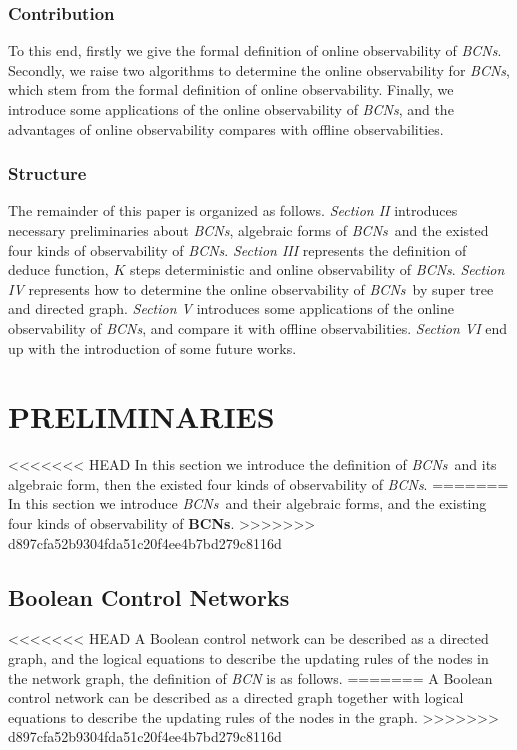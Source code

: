 \documentclass[conference]{IEEEtran} %
\def \BCNs {{\em BCNs}}
\newcommand{\rev}[1]{{\color{red}{#1}}}
\newcommand{\tl}[1]{\textcolor{blue} {TL: #1 :TL} }
\begin{document}
\subsubsection*{Contribution}
To this end, firstly we give the formal definition of online observability of {\em BCNs}. Secondly, we raise two algorithms to determine the online observability for {\em BCNs}, which stem from the formal definition of online observability. Finally, we introduce some applications of the online observability of {\em BCNs}, and the advantages of online observability compares with offline observabilities. %
\subsubsection*{Structure}
The remainder of this paper is organized as follows. {\em Section II} introduces necessary preliminaries about {\em BCNs}, algebraic forms of \BCNs\ and the existed four kinds of observability of {\em BCNs}. {\em Section III} represents the definition of deduce function, $K$ steps deterministic and online observability of {\em BCNs}. {\em Section IV} represents how to determine the online observability of \BCNs\ by super tree and directed graph. {\em Section V} introduces some applications of the online observability of {\em BCNs}, and compare it with offline observabilities. {\em Section VI} end up  with the introduction of some future works.


\section{PRELIMINARIES}
<<<<<<< HEAD
In this section we introduce the definition of \BCNs\ and its algebraic form, then the existed four kinds of observability of {\em BCNs}.
=======
In this section we introduce \BCNs\ and their algebraic forms, and  the existing four kinds of observability of {\bf BCNs}.
>>>>>>> d897cfa52b9304fda51c20f4ee4b7bd279c8116d



\subsection{Boolean Control Networks}

<<<<<<< HEAD
A Boolean control network can be described as a directed graph, and the logical equations to describe the updating rules of the nodes in the network graph, the definition of {\em BCN} is as follows. 
=======
A Boolean control network can be described as a directed graph together with logical equations to describe the updating rules of the nodes in the   graph. 
>>>>>>> d897cfa52b9304fda51c20f4ee4b7bd279c8116d
\end{document}

